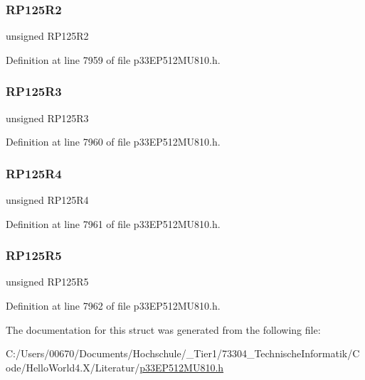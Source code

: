 \subsubsection{\texorpdfstring{R\+P125\+R2}{RP125R2}}
{\footnotesize\ttfamily unsigned R\+P125\+R2}



Definition at line 7959 of file p33\+E\+P512\+M\+U810.\+h.

\mbox{\label{structtag_r_p_o_r14_b_i_t_s_afa2eb875cbb22d787c3fc193de128d74}} 
\subsubsection{\texorpdfstring{R\+P125\+R3}{RP125R3}}
{\footnotesize\ttfamily unsigned R\+P125\+R3}



Definition at line 7960 of file p33\+E\+P512\+M\+U810.\+h.

\mbox{\label{structtag_r_p_o_r14_b_i_t_s_aa66d29ab7f00d390741fdac50f3daf0f}} 
\subsubsection{\texorpdfstring{R\+P125\+R4}{RP125R4}}
{\footnotesize\ttfamily unsigned R\+P125\+R4}



Definition at line 7961 of file p33\+E\+P512\+M\+U810.\+h.

\mbox{\label{structtag_r_p_o_r14_b_i_t_s_a3ed743632ae62c645eb9e6b52184c0a5}} 
\subsubsection{\texorpdfstring{R\+P125\+R5}{RP125R5}}
{\footnotesize\ttfamily unsigned R\+P125\+R5}



Definition at line 7962 of file p33\+E\+P512\+M\+U810.\+h.



The documentation for this struct was generated from the following file\+:\begin{DoxyCompactItemize}
\item 
C\+:/\+Users/00670/\+Documents/\+Hochschule/\+\_\+\+Tier1/73304\+\_\+\+Technische\+Informatik/\+Code/\+Hello\+World4.\+X/\+Literatur/\hyperlink{p33_e_p512_m_u810_8h}{p33\+E\+P512\+M\+U810.\+h}\end{DoxyCompactItemize}
